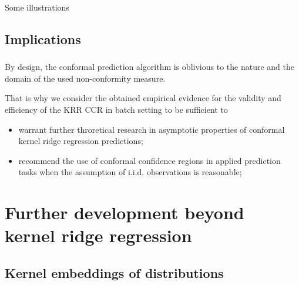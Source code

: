 \documentclass[t]{beamer}  %
\begin{document}
\begin{frame}[c]\frametitle{\insertsection}
  \framesubtitle{\insertsubsection}
  Some illustrations
\end{frame}


\subsection{Implications} %
\label{sub:implications}

\begin{frame}[c]\frametitle{\insertsection}
  \framesubtitle{\insertsubsection}
  By design, the conformal prediction algorithm is oblivious to the nature and
  the domain of the used non-conformity measure.

  That is why we consider the obtained empirical evidence for the validity and
  efficiency of the KRR CCR in batch setting to be sufficient to \begin{itemize}
    \item warrant further throretical research in asymptotic properties of conformal
    kernel ridge regression predictions;
    \item recommend the use of conformal confidence regions in applied prediction
    tasks when the assumption of i.i.d. observations is reasonable;
  \end{itemize}
\end{frame}



\section{Further development beyond kernel ridge regression} %
\label{sec:further_development_beyond_krr}

\subsection{Kernel embeddings of distributions} %
\label{sub:kernel_embeddings_of_distributions}
\end{document}
